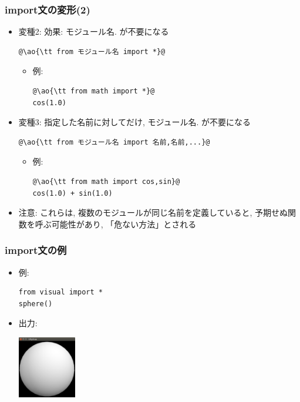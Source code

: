 \documentclass[10pt,dvipdfmx]{beamer}
\newcommand{\ao}[1]{{\color{blue}#1}}
\begin{document}
\begin{frame}[fragile]
\frametitle{import文の変形(2)}
\begin{itemize}
\item 変種2: 効果: \ao{モジュール名.} が不要になる
\begin{lstlisting}
@\ao{\tt from モジュール名 import *}@
\end{lstlisting}
\begin{itemize}
\item 例:
\begin{lstlisting}
@\ao{\tt from math import *}@
cos(1.0)
\end{lstlisting}
\end{itemize}

\item 変種3: 指定した名前に対してだけ, \ao{モジュール名.} が不要になる
\begin{lstlisting}
@\ao{\tt from モジュール名 import 名前,名前,...}@
\end{lstlisting}
\begin{itemize}
\item 例:
\begin{lstlisting}
@\ao{\tt from math import cos,sin}@
cos(1.0) + sin(1.0)
\end{lstlisting}
\end{itemize}
\item 注意: これらは, 複数のモジュールが同じ名前を定義していると, 
予期せぬ関数を呼ぶ可能性があり, 「危ない方法」とされる
\end{itemize}
\end{frame}




\begin{frame}[fragile]
\frametitle{import文の例}
\begin{itemize}
\item 例:
\begin{lstlisting}
from visual import *
sphere()
\end{lstlisting}
\item 出力:
  \begin{center}
\includegraphics[width=0.2\textwidth]{out/pdf/img/sphere.pdf}
  \end{center}
\end{itemize}
\end{frame}
\end{document}
